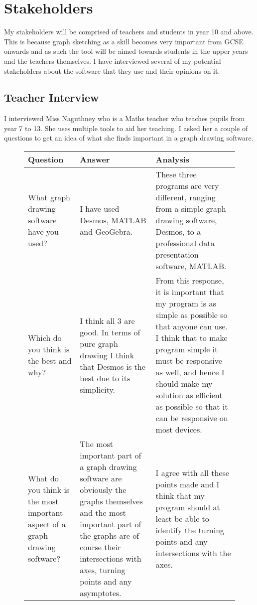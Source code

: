\documentclass[../../../main.tex]{subfiles}
\begin{document}
\chapter{Stakeholders}
My stakeholders will be comprised of teachers and students in year 10 and above. This is because graph sketching as a skill becomes very important from GCSE onwards and as such the tool will be aimed towards students in the upper years and the teachers themselves. I have interviewed several of my potential stakeholders about the software that they use and their opinions on it. 
\section{Teacher Interview}
I interviewed Miss Naguthney who is a Maths teacher who teaches pupils from year 7 to 13. She uses multiple tools to aid her teaching. I asked her a couple of questions to get an idea of what she finds important in a graph drawing software.

\begin{figure}[H]
\centering
	\begin{tabular}{|L{0.15\textwidth}|m{0.25\textwidth}|L{0.5\textwidth}|}
	\hline
	Question & Answer & Analysis \\
	\hline
	What graph drawing software have you used? & I have used Desmos, MATLAB and GeoGebra. & These three programs are very different, ranging from a simple graph drawing software, Desmos, to a professional data presentation software, MATLAB.
	 \\ \hline
	Which do you think is the best and why? & I think all 3 are good. In terms of pure graph drawing I think
	that Desmos is the best due to its simplicity. & From this response, it is important that my program is as simple as possible so that anyone can use. I think that to make program simple it must be responsive as well, and hence I should make my solution as efficient as possible so that it can be responsive on most devices. \\ \hline
	What do you think is the most important
	aspect of a graph drawing software? & The most important part of a graph drawing software are obviously the graphs themselves and the most important part of the graphs are of course their intersections with axes, turning points and any asymptotes. & I agree with all these points made and I think that my program should at least be able to identify the turning points and any intersections with the axes.\\
	\hline
	\end{tabular}
\end{figure}
\end{document}
